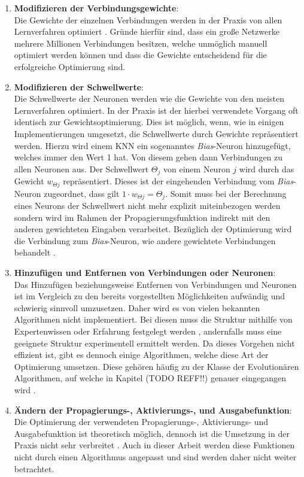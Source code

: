 \begin{enumerate}
	\item \textbf{Modifizieren der Verbindungsgewichte}:\\
	Die Gewichte der einzelnen Verbindungen werden in der Praxis von allen Lernverfahren optimiert \cite{zell2003simulation}. Gründe hierfür sind, dass ein große Netzwerke mehrere Millionen Verbindungen besitzen, welche unmöglich manuell optimiert werden können und dass die Gewichte entscheidend für die erfolgreiche Optimierung sind.

	\item\textbf{Modifizieren der Schwellwerte}:\\
	Die Schwellwerte der Neuronen werden wie die Gewichte von den meisten Lernverfahren optimiert. In der Praxis ist der hierbei verwendete Vorgang oft identisch zur Gewichtsoptimierung. Dies ist möglich, wenn, wie in einigen Implementierungen umgesetzt, die Schwellwerte durch Gewichte repräsentiert werden. Hierzu wird einem \ac{KNN} ein sogenanntes \emph{Bias}-Neuron hinzugefügt, welches immer den Wert 1 hat. Von diesem gehen dann Verbindungen zu allen Neuronen aus. Der Schwellwert $\Theta_j$ von einem Neuron $j$ wird durch das Gewicht $w_{\Theta j}$ repräsentiert. Dieses ist der eingehenden Verbindung vom \emph{Bias}-Neuron zugeordnet, dass gilt $1\cdot w_{\Theta j} = \Theta_j$. Somit muss bei der Berechnung eines Neurons der Schwellwert nicht mehr explizit miteinbezogen werden sondern wird im Rahmen der Propagierungsfunktion indirekt mit den anderen gewichteten Eingaben verarbeitet. Bezüglich der Optimierung wird die Verbindung zum \emph{Bias}-Neuron, wie andere gewichtete Verbindungen behandelt \cite{zell2003simulation}.
	\item \textbf{Hinzufügen und Entfernen von Verbindungen oder Neuronen}:\\
	Das Hinzufügen beziehungsweise Entfernen von Verbindungen und Neuronen ist im Vergleich zu den bereits vorgestellten Möglichkeiten aufwändig und schwierig sinnvoll umzusetzen. Daher wird es von vielen bekannten Algorithmen nicht implementiert. Bei diesen muss die Struktur mithilfe von Expertenwissen oder Erfahrung festgelegt werden \cite{stanley2017oreilly}, andernfalls muss eine geeignete Struktur experimentell ermittelt werden. Da dieses Vorgehen nicht effizient ist, gibt es dennoch einige Algorithmen, welche diese Art der Optimierung umsetzen. Diese gehören häufig zu der Klasse der Evolutionären Algorithmen, auf welche in Kapitel (TODO REFF!!) genauer eingegangen wird \cite{kriesel2008kleiner}.
	
	\item \textbf{Ändern der Propagierungs-, Aktivierungs-, und Ausgabefunktion}:\\
	Die Optimierung der verwendeten Propagierungs-, Aktivierungs- und Ausgabefunktion ist theoretisch möglich, dennoch ist die Umsetzung in der Praxis nicht sehr verbreitet \cite{zell2003simulation}. Auch in dieser Arbeit werden diese Funktionen nicht durch einen Algorithmus angepasst und sind werden daher nicht weiter betrachtet. 
\end{enumerate}

